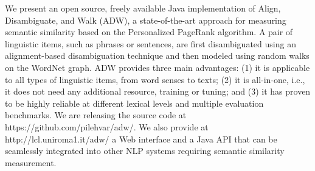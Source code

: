 We present an open source, freely available Java implementation of Align, Disambiguate, and Walk (ADW), a state-of-the-art approach for measuring semantic similarity based on the Personalized PageRank algorithm. A pair of linguistic items, such as phrases or sentences, are first disambiguated using an alignment-based disambiguation technique and then modeled using random walks on the WordNet graph. ADW provides three main advantages: (1) it is applicable to all types of linguistic items, from word senses to texts; (2) it is all-in-one, i.e., it does not need any additional resource, training or tuning; and (3) it has proven to be highly reliable at different lexical levels and multiple evaluation benchmarks. We are releasing the source code at https://github.com/pilehvar/adw/. We also provide at http://lcl.uniroma1.it/adw/ a Web interface and a Java API that can be seamlessly integrated into other NLP systems requiring semantic similarity measurement.

